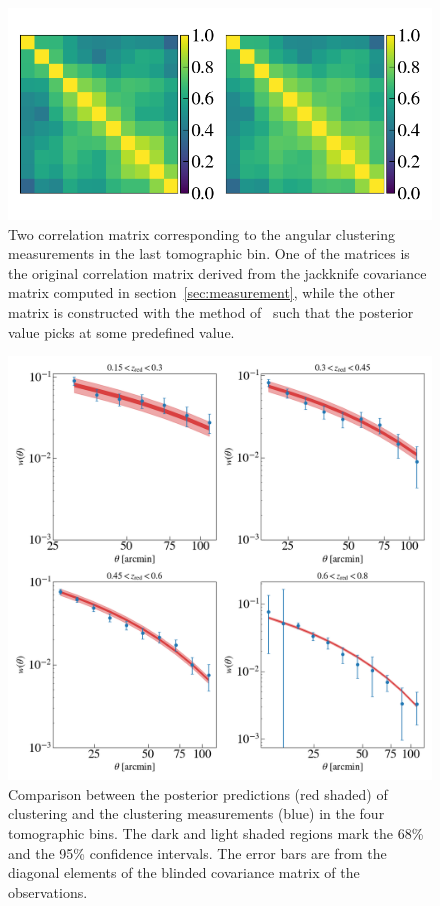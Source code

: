 \documentclass[fleqn,usenatbib,useAMS]{mnras}
\begin{document}
\begin{figure}
\includegraphics[width=\textwidth]{figures_tmp/correlation_0_6.png}
\caption{\label{fig:xi} Two correlation matrix corresponding to the angular clustering measurements in the last tomographic bin. One of the matrices is the original correlation matrix derived from the jackknife covariance matrix computed in section~\ref{sec:measurement}, while the other matrix is constructed with the method of~\citet{sellentin2019} such that the posterior value picks at some predefined value.} 
\end{figure}

\begin{figure}
\includegraphics[width=\textwidth]{figures_tmp/w_estimate.png}
\caption{\label{fig:xi} Comparison between the posterior predictions (red shaded) of clustering and the clustering measurements (blue) in the four tomographic bins. The dark and light shaded regions mark the 68\% and the 95\% confidence intervals. The error bars are from the diagonal elements of the blinded covariance matrix of the observations.} 
\end{figure}
\end{document}
